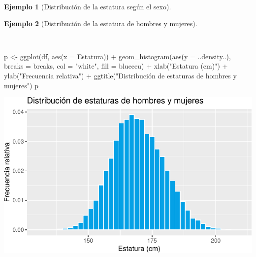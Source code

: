 \documentclass[
  a4paper,
]{scrreport}
\newenvironment{Shaded}{\begin{snugshade}}{\end{snugshade}}
\newcommand{\AttributeTok}[1]{\textcolor[rgb]{0.40,0.45,0.13}{#1}}
\newcommand{\FunctionTok}[1]{\textcolor[rgb]{0.28,0.35,0.67}{#1}}
\newcommand{\NormalTok}[1]{\textcolor[rgb]{0.00,0.23,0.31}{#1}}
\newcommand{\OtherTok}[1]{\textcolor[rgb]{0.00,0.23,0.31}{#1}}
\newcommand{\SpecialCharTok}[1]{\textcolor[rgb]{0.37,0.37,0.37}{#1}}
\newcommand{\StringTok}[1]{\textcolor[rgb]{0.13,0.47,0.30}{#1}}
\theoremstyle{plain}
\theoremstyle{definition}
\newtheorem{example}{Ejemplo}[chapter]
\theoremstyle{definition}
\theoremstyle{remark}
\begin{document}
\begin{example}[Distribución de la estatura según el
sexo]
\end{example}

\begin{example}[Distribución de la estatura de hombres y
mujeres]\protect\hypertarget{exm-distribucion-estaturas-ambos-sexos}{}\label{exm-distribucion-estaturas-ambos-sexos}

~

\begin{Shaded}
\begin{Highlighting}[]
\NormalTok{p }\OtherTok{\textless{}{-}} \FunctionTok{ggplot}\NormalTok{(df, }\FunctionTok{aes}\NormalTok{(}\AttributeTok{x =}\NormalTok{ Estatura)) }\SpecialCharTok{+}
    \FunctionTok{geom\_histogram}\NormalTok{(}\FunctionTok{aes}\NormalTok{(}\AttributeTok{y =}\NormalTok{ ..density..), }\AttributeTok{breaks =}\NormalTok{ breaks, }\AttributeTok{col =} \StringTok{"white"}\NormalTok{, }\AttributeTok{fill =}\NormalTok{ blueceu) }\SpecialCharTok{+}
    \FunctionTok{xlab}\NormalTok{(}\StringTok{"Estatura (cm)"}\NormalTok{) }\SpecialCharTok{+}
    \FunctionTok{ylab}\NormalTok{(}\StringTok{"Frecuencia relativa"}\NormalTok{) }\SpecialCharTok{+}
    \FunctionTok{ggtitle}\NormalTok{(}\StringTok{"Distribución de estaturas de hombres y mujeres"}\NormalTok{)}
\NormalTok{p}
\end{Highlighting}
\end{Shaded}

\includegraphics{02-estadistica-descriptiva_files/figure-pdf/histograma-estatura-ambos-sexo-1.pdf}

\end{example}
\end{document}

